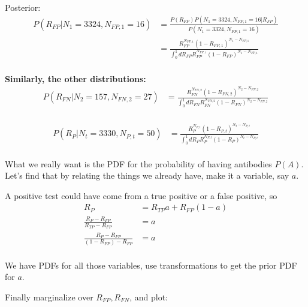 Posterior:
\begin{align*}
    P(R_{FP}|N_1=3324, N_{FP,1}=16) &= \frac{P(R_{FP}) P(N_1=3324, N_{FP,1}=16 | R_{FP})}{P(N_1=3324, N_{FP,1}=16)} \\
    &= \frac{R_{FP}^{N_{FP,1}} (1-R_{FP,1})^{N_1-N_{FP,1}}}{\int_0^1 dR_{FP} R_{FP}^{N_{FP,1}} (1-R_{FP})^{N_1-N_{FP,1}}} \\
\end{align*}

\textbf{Similarly, the other distributions:}
\begin{align*}
    P(R_{FN}|N_2=157, N_{FN,2}=27) 
    &= \frac{R_{FN}^{N_{FN,2}} (1-R_{FN,2})^{N_2-N_{FN,2}}}{\int_0^1 dR_{FN} R_{FN}^{N_{FN,2}} (1-R_{FN})^{N_2-N_{FN,2}}} \\
\end{align*}

\begin{align*}
    P(R_{P}| N_t=3330, N_{P,t}=50) 
    &= \frac{R_{P}^{N_{P,t}} (1-R_{P,t})^{N_t-N_{P,t}}}{\int_0^1 dR_{P} R_{P}^{N_{P,t}} (1-R_{P})^{N_t-N_{P,t}}} \\
\end{align*}

What we really want is the PDF for the probability of having antibodies $P(A)$. Let's find that by relating the things we already have, make it a variable, say $a$.

A positive test could have come from a true positive or a false positive, so
\begin{align*}
    R_{P} &= R_{TP}a + R_{FP}(1-a) \\
    \frac{R_{P} - R_{FP}}{R_{TP} - R_{FP}} &= a  \\
    \frac{R_{P} - R_{FP}}{(1-R_{FP}) - R_{FP}} &= a  \\
\end{align*}

We have PDFs for all those variables, use transformations to get the prior PDF for $a$.


Finally marginalize over $R_{FP}, R_{FN}$, and plot:


